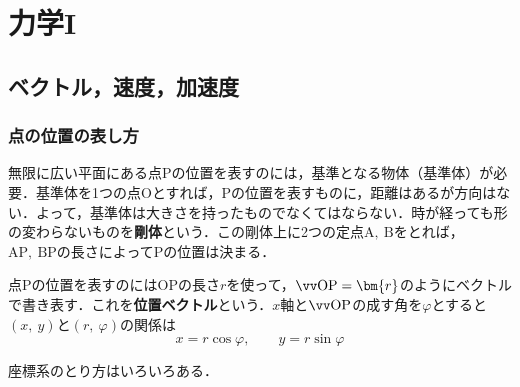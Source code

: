 \chapter{力学I}
\setcounter{page}{1}
\section{ベクトル，速度，加速度}
\subsection{点の位置の表し方}

無限に広い平面にある点$\mathrm{P}$の位置を表すのには，基準となる物体（基準体）が必要．基準体を1つの点$\mathrm{O}$とすれば，$\mathrm{P}$の位置を表すものに，距離はあるが方向はない．よって，基準体は大きさを持ったものでなくてはならない．時が経っても形の変わらないものを\textbf{剛体}という．この剛体上に2つの定点$\mathrm{A,\ B}$をとれば，$\mathrm{AP,\ BP}$の長さによって$\mathrm{P}$の位置は決まる．

点$\mathrm{P}$の位置を表すのには$\mathrm{OP}$の長さ$r$を使って，$\vecrm{OP} = \bm{r}$のようにベクトルで書き表す．これを\textbf{位置ベクトル}という．$x$軸と$\vecrm{OP}$の成す角を$\varphi$とすると$(x,\ y)$と$(r,\ \varphi)$の関係は
\begin{equation}
	x = r\cos\varphi, \qquad y = r\sin\varphi
\end{equation}

座標系のとり方はいろいろある．

